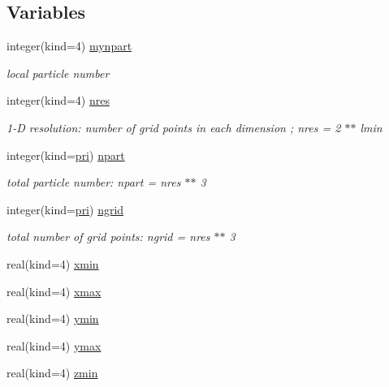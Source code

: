 \subsection*{Variables}
\begin{DoxyCompactItemize}
\item 
integer(kind=4) \hyperlink{namespacemodvariables_a6b2f4aac9da282a26d2ff36628fa0c7b}{mynpart}
\begin{DoxyCompactList}\small\item\em local particle number \end{DoxyCompactList}\item 
integer(kind=4) \hyperlink{namespacemodvariables_aa678ff0ebe26f3b0510eba5a59a69e61}{nres}
\begin{DoxyCompactList}\small\item\em 1-\/D resolution\+: number of grid points in each dimension ; nres = 2 $\ast$$\ast$ lmin \end{DoxyCompactList}\item 
integer(kind=\hyperlink{namespacemodvariables_a51e0b900e05f4302a36ddf33b6df0649}{pri}) \hyperlink{namespacemodvariables_a8c3df9e10fb71cff536986d2a33fa2c7}{npart}
\begin{DoxyCompactList}\small\item\em total particle number\+: npart = nres $\ast$$\ast$ 3 \end{DoxyCompactList}\item 
integer(kind=\hyperlink{namespacemodvariables_a51e0b900e05f4302a36ddf33b6df0649}{pri}) \hyperlink{namespacemodvariables_afeecc1a4b626f4eb8e48767dbf41d0a2}{ngrid}
\begin{DoxyCompactList}\small\item\em total number of grid points\+: ngrid = nres $\ast$$\ast$ 3 \end{DoxyCompactList}\item 
real(kind=4) \hyperlink{namespacemodvariables_aaa639d561a94ae000546755b6863b6be}{xmin}
\item 
real(kind=4) \hyperlink{namespacemodvariables_a9112a5edebd73d310c4594fca429a757}{xmax}
\item 
real(kind=4) \hyperlink{namespacemodvariables_af09b8e9f670d2074a46c55ed90661609}{ymin}
\item 
real(kind=4) \hyperlink{namespacemodvariables_aa84922c68231d1c3496d3a7d210a62e7}{ymax}
\item 
real(kind=4) \hyperlink{namespacemodvariables_aa88314239681eb1c24673391f4612eb3}{zmin}
\item 

\end{DoxyCompactItemize}

